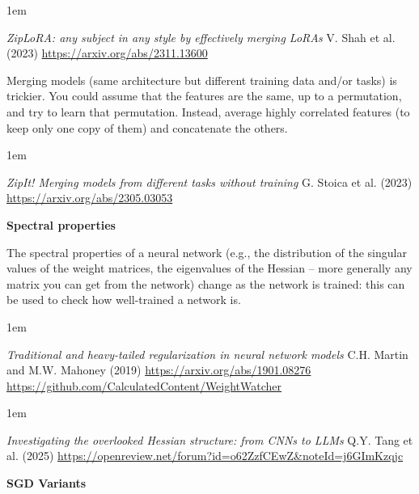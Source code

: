 \documentclass[a5paper]{article}
\newenvironment{reference}{%
  \medskip\goodbreak
  \parskip 0pt
  \raggedright
  \leftskip 1em
  \obeylines
}{\par\medskip\goodbreak}
\def\section#1{\clearpage{\vspace*{0cm}\LARGE\centering\bfseries #1\par\bigskip\bigskip}}
\def\subsection#1{{\par\bigskip\goodbreak\large\bfseries #1\par}}
\begin{document}
\begin{reference}
  \emph{ZipLoRA: any subject in any style  by effectively merging LoRAs}
  V. Shah et al. (2023)
  \url{https://arxiv.org/abs/2311.13600}
\end{reference}

Merging models (same architecture but different training data and/or tasks) is trickier.
You could assume that the features are the same, up to a permutation, and try to learn that permutation.
Instead, average highly correlated features (to keep only one copy of them) and concatenate the others.

\begin{reference}
  \emph{ZipIt! Merging models  from different tasks without training}
  G. Stoica et al. (2023)
  \url{https://arxiv.org/abs/2305.03053}
\end{reference}

\subsection{Spectral properties}

The spectral properties of a neural network (e.g., the distribution of the singular values
of the weight matrices, the eigenvalues of the Hessian -- more generally
any matrix you can get from the network) change as the network is trained:
this can be used to check how well-trained a network is.

\begin{reference}
  \emph{Traditional and heavy-tailed regularization in neural network models}
  C.H. Martin and M.W. Mahoney (2019)
  \url{https://arxiv.org/abs/1901.08276}
  \url{https://github.com/CalculatedContent/WeightWatcher}
\end{reference}

\begin{reference}
  \emph{Investigating the overlooked Hessian structure: from CNNs to LLMs}
  Q.Y. Tang et al. (2025)
  \url{https://openreview.net/forum?id=o62ZzfCEwZ&noteId=j6GImKzqjc}
\end{reference}

\section{Optimization}

\subsection{SGD Variants}
\end{document}
